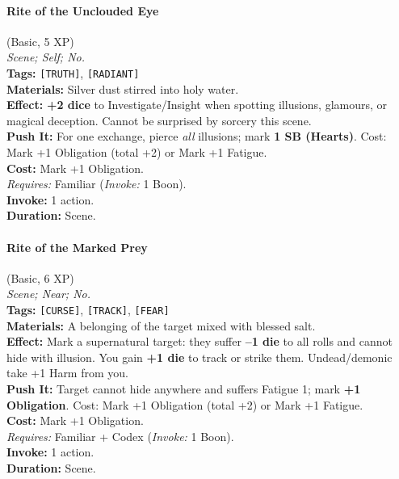 \paragraph{Rite of the Unclouded Eye} (Basic, 5 XP) \hfill \\
\emph{Scene; Self; No.} \\
\textbf{Tags:} \texttt{[TRUTH]}, \texttt{[RADIANT]} \\
\textbf{Materials:} Silver dust stirred into holy water. \\
\textbf{Effect:} \textbf{+2 dice} to Investigate/Insight when spotting illusions, glamours, or magical deception. Cannot be surprised by sorcery this scene. \\
\textbf{Push It:} For one exchange, pierce \textit{all} illusions; mark \textbf{1 SB (Hearts)}. Cost: Mark +1 Obligation (total +2) or Mark +1 Fatigue. \\
\textbf{Cost:} Mark +1 Obligation. \\
\textit{Requires:} Familiar (\textit{Invoke:} 1 Boon). \\
\textbf{Invoke:} 1 action. \\
\textbf{Duration:} Scene.

\paragraph{Rite of the Marked Prey} (Basic, 6 XP) \hfill \\
\emph{Scene; Near; No.} \\
\textbf{Tags:} \texttt{[CURSE]}, \texttt{[TRACK]}, \texttt{[FEAR]} \\
\textbf{Materials:} A belonging of the target mixed with blessed salt. \\
\textbf{Effect:} Mark a supernatural target: they suffer \textbf{--1 die} to all rolls and cannot hide with illusion. You gain \textbf{+1 die} to track or strike them. Undead/demonic take +1 Harm from you. \\
\textbf{Push It:} Target cannot hide anywhere and suffers Fatigue 1; mark \textbf{+1 Obligation}. Cost: Mark +1 Obligation (total +2) or Mark +1 Fatigue. \\
\textbf{Cost:} Mark +1 Obligation. \\
\textit{Requires:} Familiar + Codex (\textit{Invoke:} 1 Boon). \\
\textbf{Invoke:} 1 action. \\
\textbf{Duration:} Scene.

